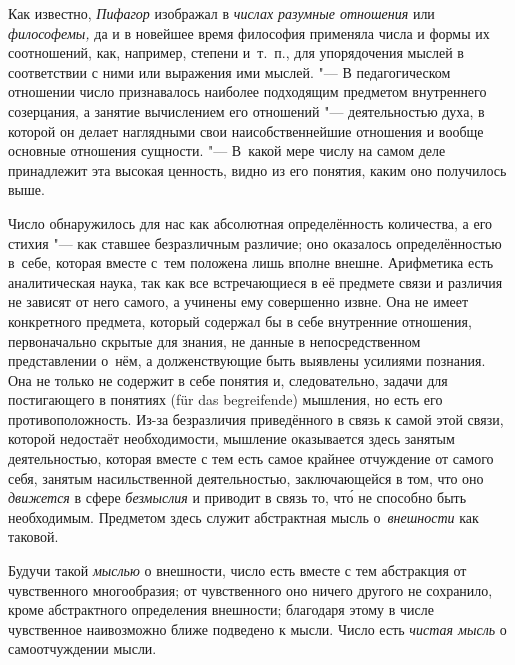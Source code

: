 Как известно, {\em Пифагор} изображал в {\em числах разумные отношения} или
{\em философемы,} да и в новейшее время философия применяла числа и формы их
соотношений, как, например, степени и~т.~п., для упорядочения мыслей в
соответствии с ними или выражения ими мыслей. "--- В педагогическом отношении число признавалось
наиболее подходящим предметом внутреннего созерцания, а занятие вычислением его
отношений "--- деятельностью духа, в которой он делает наглядными свои
наисобственнейшие отношения и вообще основные отношения сущности. "--- В~какой
мере числу на самом деле принадлежит эта высокая ценность, видно из его
понятия, каким оно получилось выше.

Число обнаружилось для нас как абсолютная определённость количества, а его
стихия "--- как ставшее безразличным различие; оно оказалось определённостью
в~себе, которая вместе с~тем положена лишь вполне внешне. Арифметика есть
аналитическая наука, так как все встречающиеся в её предмете связи и различия
не зависят от него самого, а учинены ему совершенно извне. Она не имеет
конкретного предмета, который содержал бы в себе внутренние отношения,
первоначально скрытые для знания, не данные в непосредственном представлении
о~нём, а долженствующие быть выявлены усилиями познания. Она не только не
содержит в себе понятия и, следовательно, задачи для постигающего в понятиях
(für das begrei\-fende) мышления, но есть его противоположность. Из-за
безразличия приведённого в связь к самой этой связи, которой недостаёт необходимости,
мышление оказывается здесь занятым деятельностью, которая вместе с тем есть
самое крайнее отчуждение от самого себя, занятым насильственной деятельностью,
заключающейся в том, что оно {\em движется} в сфере {\em безмыслия} и приводит
в связь то, чт\'{о} не способно быть необходимым. Предметом здесь
служит абстрактная мысль о~{\em внешности} как таковой.

Будучи такой {\em мыслью} о внешности, число есть вместе с тем абстракция от
чувственного многообразия; от чувственного оно ничего другого не сохранило,
кроме абстрактного определения внешности; благодаря этому в числе чувственное
наивозможно ближе подведено к мысли. Число есть {\em чистая мысль} о
самоотчуждении мысли.

